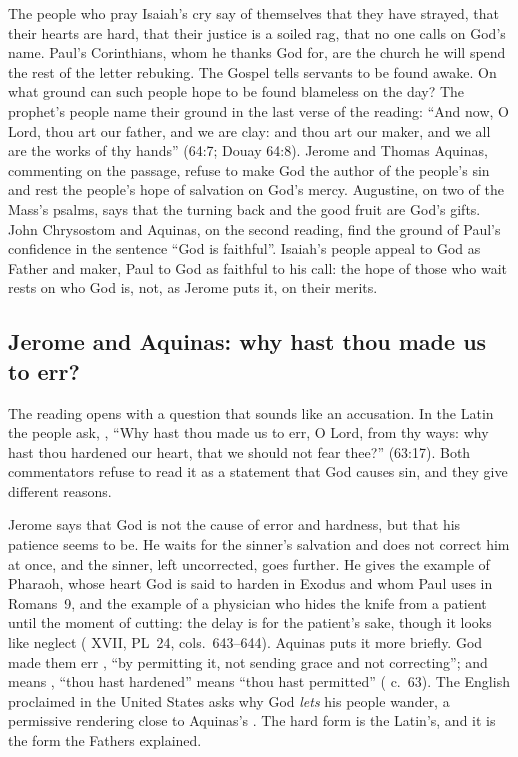 \label{sec:clay-and-faithful-potter}

The people who pray Isaiah's cry say of themselves that they have strayed,
that their hearts are hard, that their justice is a soiled rag, that no one calls on God's name. Paul's Corinthians,
whom he thanks God for, are the church he will spend the rest of the letter
rebuking. The Gospel tells servants to be found awake. On what ground can such
people hope to be found blameless on the day? The prophet's people name their
ground in the last verse of the reading: ``And now, O Lord, thou art our father, and we
are clay: and thou art our maker, and we all are the works of thy hands''
(64:7; Douay 64:8). Jerome and Thomas Aquinas, commenting on the passage,
refuse to make God the author of the people's sin and rest the people's hope
of salvation on God's mercy. Augustine, on two of the Mass's psalms, says that
the turning back and the good fruit are God's gifts. John Chrysostom and
Aquinas, on the second reading, find the ground of Paul's confidence in the
sentence ``God is faithful''. Isaiah's people appeal to God as Father and
maker, Paul to God as faithful to his call: the hope of those who wait rests
on who God is, not, as Jerome puts it, on their merits.

\subsection{Jerome and Aquinas: why hast thou made us to err?}

The reading opens with a question that sounds like an accusation. In the Latin
the people ask, , ``Why hast thou made us to err, O
Lord, from thy ways: why hast thou hardened our heart, that we should not
fear thee?'' (63:17). Both commentators refuse to read it as a statement that
God causes sin, and they give different reasons.

Jerome says that God is not the cause of error and hardness, but that his
patience seems to be. He waits for the sinner's salvation and does not
correct him at once, and the sinner, left uncorrected, goes further. He gives
the example of Pharaoh, whose heart God is said to harden in Exodus and whom
Paul uses in Romans~9, and the example of a physician who hides the knife from
a patient until the moment of cutting: the delay is for the patient's sake,
though it looks like neglect ( XVII, PL~24,
cols.~643--644). Aquinas puts it more briefly. God made them err
, ``by permitting
it, not sending grace and not correcting''; and  means
, ``thou hast hardened'' means ``thou hast permitted''
( c.~63). The English proclaimed in the United
States asks why God \emph{lets} his people wander, a permissive rendering
close to Aquinas's . The hard form is the Latin's, and it
is the form the Fathers explained.

